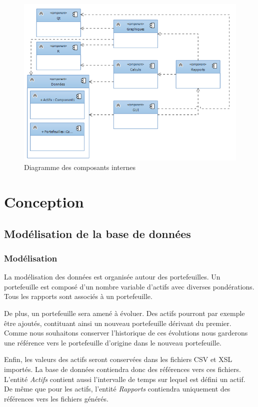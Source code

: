 \documentclass[a4paper,titlepage,french]{report}
\begin{document}
\begin{figure}
  	\center
  	\includegraphics[width=1\textwidth]{architecture_generale.png}
  	\caption{Diagramme des composants internes}
  	\label{fig:diagramme-composants}
\end{figure}



\chapter{Conception}

\section{Modélisation de la base de données}

\subsection{Modélisation}

La modélisation des données est organisée autour des portefeuilles.
Un portefeuille est composé d'un nombre variable d'actifs avec diverses pondérations.
Tous les rapports sont associés à un portefeuille.

De plus, un portefeuille sera amené à évoluer.
Des actifs pourront par exemple être ajoutés, contituant ainsi un nouveau portefeuille dérivant du premier.
Comme nous souhaitons conserver l'historique de ces évolutions nous garderons une référence vers le portefeuille d'origine dans le nouveau portefeuille.

Enfin, les valeurs des actifs seront conservées dans les fichiers CSV et XSL importés. 
La base de données contiendra donc des références vers ces fichiers.
L'entité \textit{Actifs} contient aussi l'intervalle de temps sur lequel est défini un actif.
De même que pour les actifs, l'entité \textit{Rapports} contiendra uniquement des références vers les fichiers générés.
\end{document}
